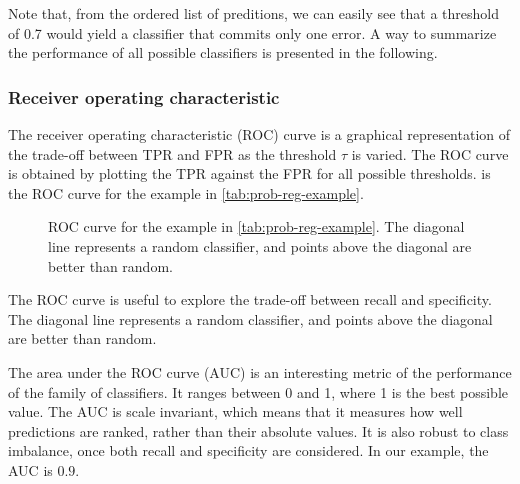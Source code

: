 Note that, from the ordered list of preditions, we can easily see that a threshold of 0.7
would yield a classifier that commits only one error.  A way to summarize the performance
of all possible classifiers is presented in the following.

\subsubsection{Receiver operating characteristic}

The receiver operating characteristic (ROC) curve is a graphical representation of the
trade-off between TPR and FPR as the threshold
$\tau$ is varied.  The ROC curve is obtained by plotting the TPR against the FPR for all
possible thresholds.   is the ROC curve for the example in
\cref{tab:prob-reg-example}.

\begin{figure}
  \centering
  \caption{
  ROC curve for the example in \cref{tab:prob-reg-example}.  The diagonal line represents
  a random classifier, and points above the diagonal are better than random.
  }
  \label{fig:roc-example}
\end{figure}

The ROC curve is useful to explore the trade-off between recall and specificity.  The
diagonal line represents a random classifier, and points above the diagonal are better
than random.

The area under the ROC curve (AUC) is an interesting metric of the performance of the
family of classifiers.  It ranges between 0 and 1, where 1 is the best possible value.
The AUC is scale invariant, which means that it measures how well
predictions are ranked, rather than their absolute values.  It is also robust to
class imbalance, once both recall and specificity are considered.
In our example, the AUC is $0.9$.

